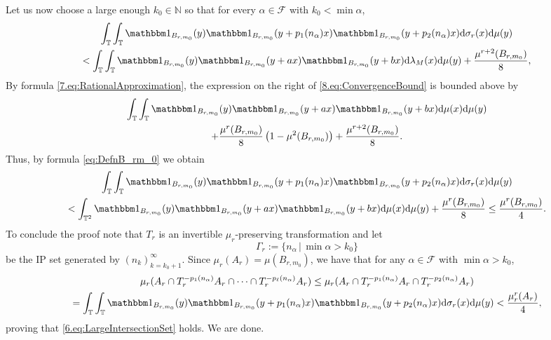 \documentclass[11pt,american,preprint]{elsarticle}
\numberwithin{equation}{section}
\theoremstyle{plain}
\theoremstyle{plain*}
\theoremstyle{plain}
\theoremstyle{plain*}
\theoremstyle{plain}
\theoremstyle{plain*}
\theoremstyle{remark}
\theoremstyle{remark*}
\theoremstyle{remark}
\theoremstyle{remark*}
\theoremstyle{remark}
\theoremstyle{remark*}
\theoremstyle{plain}
\theoremstyle{definition}
\theoremstyle{plain}
\theoremstyle{plain} %
\newcommand{\N}{\mathbb{N}}
\begin{document}
Let us now choose a large enough $k_0\in\N$ so  that for every $\alpha\in \mathcal F$ with $k_0<\min \alpha$,
\begin{multline}\label{8.eq:ConvergenceBound}
\int_{\mathbb T}\int_{\mathbb T}\mathbbm 1_{B_{r,m_0}}(y)\mathbbm 1_{B_{r,m_0}}(y+p_1(n_\alpha)x)\mathbbm 1_{B_{r,m_0}}(y+p_2(n_\alpha)x)\text{d}\sigma_r(x)\text{d}\mu(y)\\<\int_{\mathbb T}\int_{\mathbb T}\mathbbm 1_{B_{r,m_0}}(y)\mathbbm 1_{B_{r,m_0}}(y+ax)\mathbbm 1_{B_{r,m_0}}(y+bx)\text{d}\lambda_M(x)\text{d}\mu(y)+\frac{\mu^{r+2}(B_{r,m_0})}{8},
\end{multline}
By formula \eqref{7.eq:RationalApproximation}, the expression on the right of \eqref{8.eq:ConvergenceBound} is bounded above by 
\begin{multline}\label{8.eq:UpperBoundUsingLambda_M}
    \int_{\mathbb T}\int_{\mathbb T}\mathbbm 1_{B_{r,m_0}}(y)\mathbbm 1_{B_{r,m_0}}(y+ax)\mathbbm 1_{B_{r,m_0}}(y+bx)\text{d}\mu(x)\text{d}\mu(y)\\
+\frac{\mu^r(B_{r,m_0})}{8}\left(1-\mu^2(B_{r,m_0})\right)+\frac{\mu^{r+2}(B_{r,m_0})}{8}.
\end{multline}
Thus, by formula \eqref{eq:DefnB_rm_0} we obtain 
\begin{multline*}
\int_{\mathbb T}\int_{\mathbb T}\mathbbm 1_{B_{r,m_0}}(y)\mathbbm 1_{B_{r,m_0}}(y+p_1(n_\alpha)x)\mathbbm 1_{B_{r,m_0}}(y+p_2(n_\alpha)x)\text{d}\sigma_r(x)\text{d}\mu(y)\\
<\int_{\mathbb T^2}\mathbbm 1_{B_{r,m_0}}(y)\mathbbm 1_{B_{r,m_0}}(y+ax)\mathbbm 1_{B_{r,m_0}}(y+bx)\text{d}\mu(x)\text{d}\mu(y)+\frac{\mu^r(B_{r,m_0})}{8}
\leq\frac{\mu^r(B_{r,m_0})}{4}.
\end{multline*}
To conclude the proof note that $T_r$ is an invertible $\mu_r$-preserving transformation and let  $$\Gamma_r:=\{n_{\alpha}\,|\,\min \alpha>k_0\}$$
be the  IP set generated by $(n_k)_{k=k_0+1}^\infty$. Since $\mu_r(A_r)=\mu(B_{r,m_0})$, we have  that  for any $\alpha\in\mathcal F$ with $\min \alpha>k_0$,
\begin{multline}
 \mu_r(A_r\cap T_r^{-p_1(n_\alpha)}A_r\cap \cdots\cap T_r^{-p_\ell(n_\alpha)}A_r)\leq \mu_r(A_r\cap T_r^{-p_1(n_\alpha)}A_r\cap T_r^{-p_2(n_\alpha)}A_r)\\
 =\int_{\mathbb T}\int_{\mathbb T}\mathbbm 1_{B_{r,m_0}}(y)\mathbbm 1_{B_{r,m_0}}(y+p_1(n_\alpha)x)\mathbbm 1_{B_{r,m_0}}(y+p_2(n_\alpha)x)\text{d}\sigma_r(x)\text{d}\mu(y)<\frac{\mu_r^r(A_r)}{4},
 \end{multline}
  proving that \eqref{6.eq:LargeIntersectionSet} holds. We are done.\hfill \qedsymbol
\end{document}
